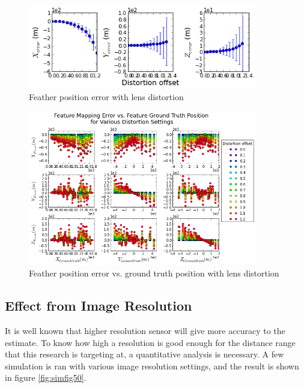 \begin{figure}[h]
  \centering
  \includegraphics[width=10cm,keepaspectratio=true]{./Figures/SimulationFigures/Figure45.png}
  \caption{Feather position error with lens distortion}
  \label{fig:simfig45}
\end{figure}

\begin{figure}[h]
  \centering
  \includegraphics[width=10cm,keepaspectratio=true]{./Figures/SimulationFigures/Figure46.png}
  \caption{Feather position error vs. ground truth position with lens distortion}
  \label{fig:simfig46}
\end{figure}

\FloatBarrier

\subsection{Effect from Image Resolution}

It is well known that higher resolution sensor will give more accuracy
to the estimate. To know how high a resolution is good enough for the
distance range that this research is targeting at, a quantitative analysis is
necessary. A few simulation is ran with various image
resolution settings, and the result is shown in figure \ref{fig:simfig50}. 

